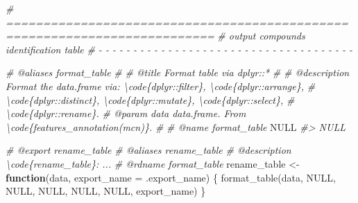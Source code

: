 \documentclass[
]{article}
\newenvironment{Shaded}{\begin{snugshade}}{\end{snugshade}}
\newcommand{\AttributeTok}[1]{\textcolor[rgb]{0.77,0.63,0.00}{#1}}
\newcommand{\CommentTok}[1]{\textcolor[rgb]{0.56,0.35,0.01}{\textit{#1}}}
\newcommand{\ConstantTok}[1]{\textcolor[rgb]{0.00,0.00,0.00}{#1}}
\newcommand{\ControlFlowTok}[1]{\textcolor[rgb]{0.13,0.29,0.53}{\textbf{#1}}}
\newcommand{\FunctionTok}[1]{\textcolor[rgb]{0.00,0.00,0.00}{#1}}
\newcommand{\NormalTok}[1]{#1}
\newcommand{\OtherTok}[1]{\textcolor[rgb]{0.56,0.35,0.01}{#1}}
\begin{document}
\begin{Shaded}
\begin{Highlighting}[]
\CommentTok{\# ==========================================================================}
\CommentTok{\# output compounds identification table }
\CommentTok{\# {-} {-} {-} {-} {-} {-} {-} {-} {-} {-} {-} {-} {-} {-} {-} {-} {-} {-} {-} {-} {-} {-} {-} {-} {-} {-} {-} {-} {-} {-} {-} {-} {-} {-} {-} {-} {-}}

\CommentTok{\#\textquotesingle{} @aliases format\_table}
\CommentTok{\#\textquotesingle{}}
\CommentTok{\#\textquotesingle{} @title Format table via dplyr::*}
\CommentTok{\#\textquotesingle{}}
\CommentTok{\#\textquotesingle{} @description Format the data.frame via: \textbackslash{}code\{dplyr::filter\}, \textbackslash{}code\{dplyr::arrange\},}
\CommentTok{\#\textquotesingle{} \textbackslash{}code\{dplyr::distinct\}, \textbackslash{}code\{dplyr::mutate\}, \textbackslash{}code\{dplyr::select\},}
\CommentTok{\#\textquotesingle{} \textbackslash{}code\{dplyr::rename\}.}
\CommentTok{\#\textquotesingle{} @param data data.frame. From \textbackslash{}code\{features\_annotation(mcn)\}.}
\CommentTok{\#\textquotesingle{}}
\CommentTok{\#\textquotesingle{} @name format\_table}
\ConstantTok{NULL}
\CommentTok{\#\textgreater{} NULL}

\CommentTok{\#\textquotesingle{} @export rename\_table}
\CommentTok{\#\textquotesingle{} @aliases rename\_table}
\CommentTok{\#\textquotesingle{} @description \textbackslash{}code\{rename\_table\}: ...}
\CommentTok{\#\textquotesingle{} @rdname format\_table}
\NormalTok{rename\_table }\OtherTok{\textless{}{-}} 
  \ControlFlowTok{function}\NormalTok{(data, }\AttributeTok{export\_name =}\NormalTok{ .export\_name) \{}
    \FunctionTok{format\_table}\NormalTok{(data, }\ConstantTok{NULL}\NormalTok{, }\ConstantTok{NULL}\NormalTok{, }\ConstantTok{NULL}\NormalTok{, }\ConstantTok{NULL}\NormalTok{, }\ConstantTok{NULL}\NormalTok{, export\_name)}
\NormalTok{  \}}


\end{Highlighting}
\end{Shaded}
\end{document}
